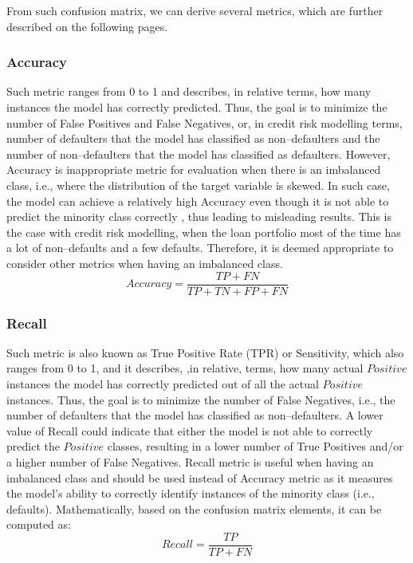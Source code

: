 From such confusion matrix, we can derive several metrics, which are further described on the following pages.

\subsubsection{Accuracy}
Such metric ranges from 0 to 1 and describes, in relative terms, how many instances the model has correctly predicted. Thus, the goal is to minimize the number of False Positives and False Negatives, or, in credit risk modelling terms, number of defaulters that the model has classified as non--defaulters and the number of non--defaulters that the model has classified as defaulters.
However, Accuracy is inappropriate metric for evaluation when there is an imbalanced class, i.e., where the distribution of the target variable is skewed.
In such case, the model can achieve a relatively high Accuracy even though it is not able to predict the minority class correctly \citep{brownlee2021failure}, thus leading to misleading results.
This is the case with credit risk modelling, when the loan portfolio most of the time has a lot of non--defaults and a few defaults.
Therefore, it is deemed appropriate to consider other metrics when having an imbalanced class.
\begin{equation}\label{eq}
Accuracy = \frac{TP + FN}{TP + TN + FP + FN}
\end{equation}


\subsubsection{Recall}
\label{subsubsec:recall}
Such metric is also known as True Positive Rate (TPR) or Sensitivity, which also ranges from 0 to 1, and it describes, ,in relative, terms, how many actual $Positive$ instances the model has correctly predicted out of all the actual $Positive$ instances. Thus, the goal is to minimize the number of False Negatives, i.e., the number of defaulters that the model has classified as non--defaulters.
A lower value of Recall could indicate that either the model is not able to correctly predict the $Positive$ classes, resulting in a lower number of True Positives and/or a higher number of False Negatives.
Recall metric is useful when having an imbalanced class and should be used instead of Accuracy metric as it measures the model's ability to correctly identify instances of the minority class (i.e., defaults).
Mathematically, based on the confusion matrix elements, it can be computed as:
\begin{equation}\label{eq}
     Recall = \frac{TP}{TP + FN}
\end{equation}



